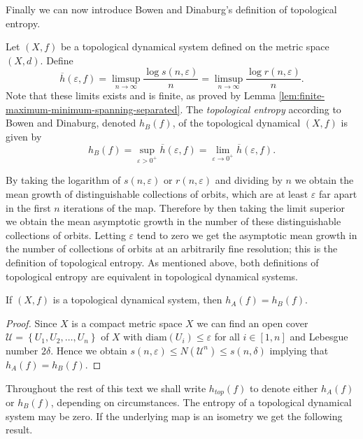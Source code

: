Finally we can now introduce Bowen and Dinaburg's definition of topological entropy.

\begin{defn}
    Let $(X, f)$ be a topological dynamical system defined on the metric space $(X, d)$. Define \[\overline{h}(\varepsilon, f) = \limsup_{n \to \infty}\frac{\log{s(n, \varepsilon)}}{n} = \limsup_{n \to \infty} \frac{\log{r(n, \varepsilon)}}{n}.\] Note that these limits exists and is finite, as proved by Lemma \ref{lem:finite-maximum-minimum-spanning-separated}. The \emph{topological entropy} according to Bowen and Dinaburg, denoted $h_B(f)$, of the topological dynamical $(X, f)$ is given by \[h_B(f) = \sup_{\varepsilon > 0^+}\overline{h}(\varepsilon, f) = \lim_{\varepsilon \to 0^+}\overline{h}(\varepsilon, f).\]
\end{defn}

By taking the logarithm of $s(n, \varepsilon)$ or $r(n, \varepsilon)$ and dividing by $n$ we obtain the mean growth of distinguishable collections of orbits, which are at least $\varepsilon$ far apart in the first $n$ iterations of the map. Therefore by then taking the limit superior we obtain the mean asymptotic growth in the number of these distinguishable collections of orbits. Letting $\varepsilon$ tend to zero we get the asymptotic mean growth in the number of collections of orbits at an arbitrarily fine resolution; this is the definition of topological entropy. As mentioned above, both definitions of topological entropy are equivalent in topological dynamical systems.

\begin{prop}
    If $(X, f)$ is a topological dynamical system, then $h_A(f) = h_B(f)$.
    \begin{proof}
        Since $X$ is a compact metric space $X$ we can find an open cover $\mathcal{U} = \left\lbrace U_1, U_2, \dots, U_n \right\rbrace$ of $X$ with $\text{diam}(U_i) \leq \varepsilon$ for all $i \in [1, n]$ and Lebesgue number $2\delta$. Hence we obtain $s(n, \varepsilon) \leq N(\mathcal{U}^n) \leq s(n, \delta)$ implying that $h_A(f) = h_B(f)$.
    \end{proof}
\end{prop}

Throughout the rest of this text we shall write $h_{top}(f)$ to denote either $h_A(f)$ or $h_B(f)$, depending on circumstances. The entropy of a topological dynamical system may be zero. If the underlying map is an isometry we get the following result.

